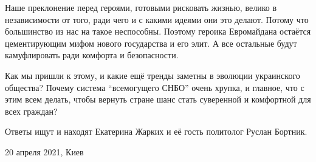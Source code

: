 Наше преклонение перед героями, готовыми рисковать жизнью, велико в
независимости от того, ради чего и с какими идеями они это делают.  Потому что
большинство из нас на такое неспособны. Поэтому героика Евромайдана остаётся
цементирующим мифом нового государства и его элит. А все остальные будут
камуфлировать ради комфорта и безопасности.  

Как мы пришли к этому, и какие ещё тренды заметны в эволюции украинского
общества? Почему система \enquote{всемогущего СНБО} очень хрупка, и главное, что с этим
всем делать, чтобы вернуть стране шанс стать суверенной и комфортной для всех
граждан?

Ответы ищут и находят Екатерина Жарких и её гость политолог Руслан Бортник. 

20 апреля 2021, Киев
